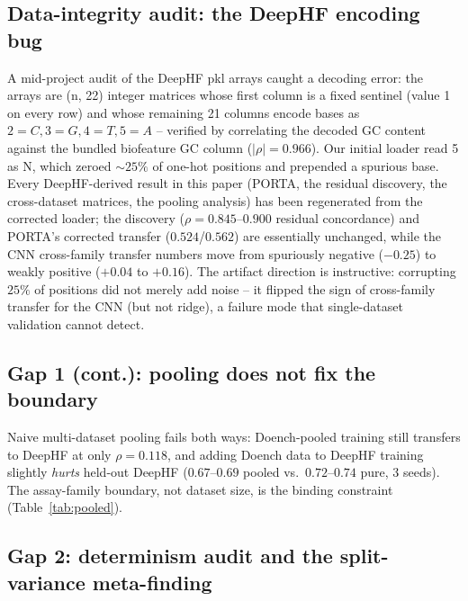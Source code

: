 \documentclass[12pt]{article}
\begin{document}
\subsection{Data-integrity audit: the DeepHF encoding bug}
\label{sec:encoding-audit}
A mid-project audit of the DeepHF pkl arrays caught a decoding error:
the arrays are (n, 22) integer matrices whose first column is a fixed
sentinel (value 1 on every row) and whose remaining 21 columns encode
bases as $2{=}C, 3{=}G, 4{=}T, 5{=}A$ -- verified by correlating the
decoded GC content against the bundled biofeature GC column
($|\rho|=0.966$). Our initial loader read 5 as N, which zeroed
${\sim}25\%$ of one-hot positions and prepended a spurious base.
Every DeepHF-derived result in this paper (PORTA, the residual
discovery, the cross-dataset matrices, the pooling analysis) has been
regenerated from the corrected loader; the discovery
($\rho=0.845$--$0.900$ residual concordance) and PORTA's corrected
transfer ($0.524$/$0.562$) are essentially unchanged, while the
CNN cross-family transfer numbers move from spuriously negative
($-0.25$) to weakly positive ($+0.04$ to $+0.16$). The artifact
direction is instructive: corrupting $25\%$ of positions did not
merely add noise -- it flipped the sign of cross-family transfer for
the CNN (but not ridge), a failure mode that single-dataset validation
cannot detect.
\subsection{Gap 1 (cont.): pooling does not fix the boundary}
Naive multi-dataset pooling fails both ways: Doench-pooled training still
transfers to DeepHF at only $\rho=0.118$, and adding Doench data to DeepHF
training slightly \emph{hurts} held-out DeepHF ($0.67$--$0.69$ pooled vs.\
$0.72$--$0.74$ pure, 3 seeds). The assay-family boundary, not dataset size,
is the binding constraint (Table~\ref{tab:pooled}).

\subsection{Gap 2: determinism audit and the split-variance meta-finding}
\end{document}
